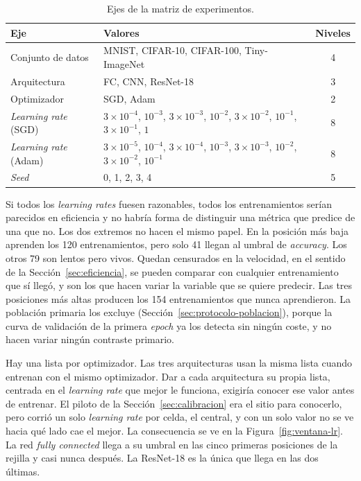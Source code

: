 \begin{table}[ht]
\centering
\small
\setlength{\tabcolsep}{4pt}
\caption{Ejes de la matriz de experimentos.}
\label{tab:matriz}
\begin{tabular}{llc}
\toprule
\textbf{Eje} & \textbf{Valores} & \textbf{Niveles} \\
\midrule
Conjunto de datos & MNIST, CIFAR-10, CIFAR-100, Tiny-ImageNet & 4 \\
Arquitectura      & FC, CNN, ResNet-18 & 3 \\
Optimizador       & SGD, Adam & 2 \\
\addlinespace
\emph{Learning rate} (SGD)  & $3 \times 10^{-4}$, $10^{-3}$, $3 \times 10^{-3}$, $10^{-2}$, $3 \times 10^{-2}$, $10^{-1}$, $3 \times 10^{-1}$, $1$ & 8 \\
\emph{Learning rate} (Adam) & $3 \times 10^{-5}$, $10^{-4}$, $3 \times 10^{-4}$, $10^{-3}$, $3 \times 10^{-3}$, $10^{-2}$, $3 \times 10^{-2}$, $10^{-1}$ & 8 \\
\emph{Seed}                 & 0, 1, 2, 3, 4 & 5 \\
\bottomrule
\end{tabular}
\end{table}

Si todos los \emph{learning rates} fuesen razonables, todos los entrenamientos serían parecidos en eficiencia y no habría forma de distinguir una métrica que predice de una que no. Los dos extremos no hacen el mismo papel. En la posición más baja aprenden los 120 entrenamientos, pero solo 41 llegan al umbral de \emph{accuracy}. Los otros 79 son lentos pero vivos. Quedan censurados en la velocidad, en el sentido de la Sección~\ref{sec:eficiencia}, se pueden comparar con cualquier entrenamiento que sí llegó, y son los que hacen variar la variable que se quiere predecir. Las tres posiciones más altas producen los 154 entrenamientos que nunca aprendieron. La población primaria los excluye (Sección~\ref{sec:protocolo-poblacion}), porque la curva de validación de la primera \emph{epoch} ya los detecta sin ningún coste, y no hacen variar ningún contraste primario.

Hay una lista por optimizador. Las tres arquitecturas usan la misma lista cuando entrenan con el mismo optimizador. Dar a cada arquitectura su propia lista, centrada en el \emph{learning rate} que mejor le funciona, exigiría conocer ese valor antes de entrenar. El piloto de la Sección~\ref{sec:calibracion} era el sitio para conocerlo, pero corrió un solo \emph{learning rate} por celda, el central, y con un solo valor no se ve hacia qué lado cae el mejor. La consecuencia se ve en la Figura~\ref{fig:ventana-lr}. La red \emph{fully connected} llega a su umbral en las cinco primeras posiciones de la rejilla y casi nunca después. La ResNet-18 es la única que llega en las dos últimas.

